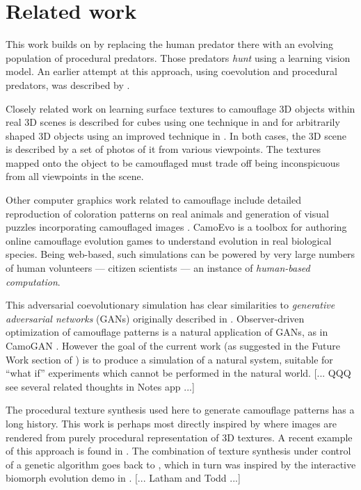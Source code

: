 \documentclass[acmtog]{acmart}
\newcommand{\jargon}[1]{\textit{#1}}
\begin{document}
\section{Related work}
This work builds on \citet{reynolds_iec_2011} by replacing the human predator there with an evolving population of procedural predators. Those predators \jargon{hunt} using a learning vision model. An earlier attempt at this approach, using coevolution and procedural predators, was described by \citet{harrington_coevolution_2014}.
\par
Closely related work on learning surface textures to camouflage 3D objects within real 3D scenes is described for cubes using one technique in \citet{owens_camouflaging_2014} and for arbitrarily shaped 3D objects using an improved technique in \citet{guo_ganmouflage_2022}. In both cases, the 3D scene is described by a set of photos of it from various viewpoints. The textures mapped onto the object to be camouflaged must trade off being inconspicuous from all viewpoints in the scene.
\par
Other computer graphics work related to camouflage include detailed reproduction of coloration patterns on real animals \cite{de_gomensoro_malheiros_leopard_2020} and generation of visual puzzles incorporating camouflaged images \cite{chu_camo_image_2010} \cite{Zhang_Yin_Nie_Zheng_2020}. CamoEvo \cite{hancock_camoevo_2022} is a toolbox for authoring online camouflage evolution games to understand evolution in real biological species. Being web-based, such simulations can be powered by very large numbers of human volunteers — citizen scientists — an instance of \jargon{human-based computation}.
\par
This adversarial coevolutionary simulation has clear similarities to \jargon{generative adversarial networks} (GANs) originally described in \citet{goodfellow_gan_2014}. Observer-driven optimization of camouflage patterns is a natural application of GANs, as in CamoGAN \cite{talas_camogan_2020}. However the goal of the current work (as suggested in the Future Work section of \citet{reynolds_iec_2011}) is to produce a simulation of a natural system, suitable for “what if” experiments which cannot be performed in the natural world. [... QQQ see several related thoughts in Notes app ...]
\par
The procedural texture synthesis used here to generate camouflage patterns has a long history. This work is perhaps most directly inspired by \citet{perlin_image_1985} where images are rendered from purely procedural representation of 3D textures. A recent example of this approach is found in \citet{Guerrero_MatFormer_2022}. The combination of texture synthesis under control of a genetic algorithm goes back to \citet{sims_artificial_1991}, which in turn was inspired by the interactive biomorph evolution demo in \citet{dawkins_blind_1986}. [... Latham and Todd ...]
\end{document}
